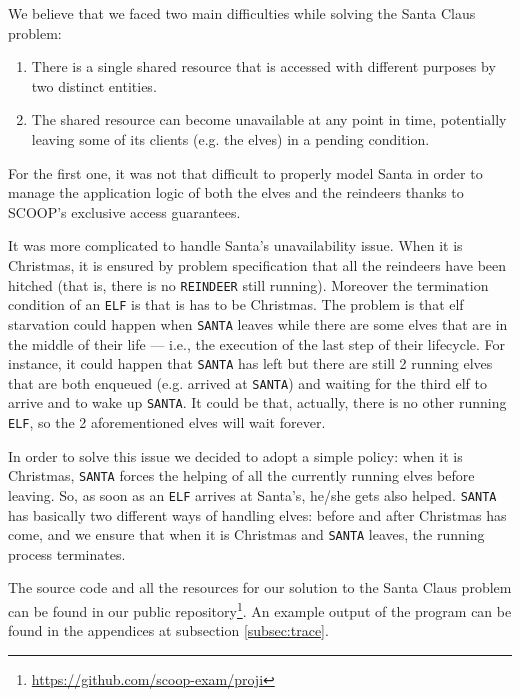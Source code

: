 We believe that we faced two main difficulties while solving the Santa Claus problem:

\begin{enumerate}
    \item There is a single shared resource that is accessed with different
purposes by two distinct entities.
    \item The shared resource can become unavailable at any point in time,
potentially leaving some of its clients (e.g. the elves) in a pending
condition.
\end{enumerate}

For the first one, it was not that difficult to properly model Santa in order
to manage the application logic of both the elves and the reindeers thanks to
SCOOP's exclusive access guarantees.

It was more complicated to handle Santa's unavailability issue. When it is
Christmas, it is ensured by problem specification that all the reindeers have
been hitched (that is, there is no \texttt{REINDEER} still running). Moreover
the termination condition of an \texttt{ELF} is that is has to be Christmas.
The problem is that elf starvation could happen when \texttt{SANTA} leaves
while there are some elves that are in the middle of their life --- i.e., the
execution of the last step of their lifecycle. For instance, it could happen
that \texttt{SANTA} has left but there are still 2 running elves that are both
enqueued (e.g.  arrived at \texttt{SANTA}) and waiting for the third elf to
arrive and to wake up \texttt{SANTA}. It could be that, actually, there is no
other running \texttt{ELF}, so the 2 aforementioned elves will wait forever.

In order to solve this issue we decided to adopt a simple policy: when it is
Christmas, \texttt{SANTA} forces the helping of all the currently running elves
before leaving. So, as soon as an \texttt{ELF} arrives at Santa's, he/she gets
also helped. \texttt{SANTA} has basically two different ways of handling elves:
before and after Christmas has come, and we ensure that when it is Christmas
and \texttt{SANTA} leaves, the running process terminates.

The source code and all the resources for our solution to the Santa Claus
problem can be found in our public repository\footnote{\url{https://github.com/scoop-exam/proji}}.
An example output of the program can be found in the appendices at subsection
\ref{subsec:trace}.

